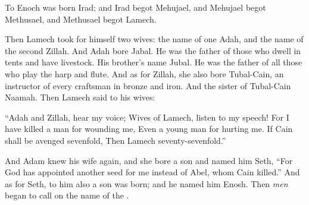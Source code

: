 \bverse To Enoch was born Irad; and Irad begot Mehujael, and Mehujael begot Methusael, and Methusael begot Lamech.

\bverse Then Lamech took for himself two wives: the name of one \was Adah, and the name of the second \was Zillah.
\bverse And Adah bore Jabal. He was the father of those who dwell in tents and have livestock.
\bverse His brother's name \was Jubal. He was the father of all those who play the harp and flute.
\bverse And as for Zillah, she also bore Tubal-Cain, an instructor of every craftsman in bronze and iron. And the sister of Tubal-Cain \was Naamah.
\bverse Then Lamech said to his wives:
\begin{bquotation}
``Adah and Zillah, hear my voice; Wives of Lamech, listen to my speech! For I have killed a man for wounding me, Even a young man for hurting me. \bverse If Cain shall be avenged sevenfold, Then Lamech seventy-sevenfold.''
\end{bquotation}


\bverse And Adam knew his wife again, and she bore a son and named him Seth, ``For God has appointed another seed for me instead of Abel, whom Cain killed.''
\bverse And as for Seth, to him also a son was born; and he named him Enosh. Then \textit{men} began to call on the name of the \lord.
